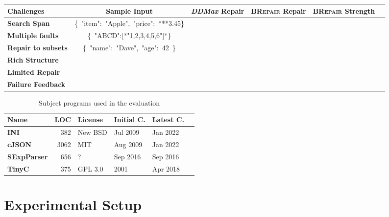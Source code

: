 \documentclass[sigconf,review,anonymous]{acmart}
\newcommand{\approach}{\textsc{BRepair}\xspace}
\newcommand{\ddmax}{\textit{DDMax}\xspace}
\begin{document}
\begin{table*}[!tbp]\centering
\caption{Debugging Richly Structured Inputs: \approach versus \ddmax}
\begin{tabular}{|l | c | r | r | r | r |}
\hline
\textbf{Challenges} & \textbf{Sample Input}  &  \textbf{\ddmax Repair} & \textbf{\approach Repair} & \textbf{\approach Strength}  \\
\hline 
\textbf{Search Span} %
&  \{\ "item":\ "Apple",\ "price":\ ***3.45\} & & & \\ 
\textbf{Multiple faults} & \{\ "ABCD":[*"1,2,3,4,5,6"]*\} & & & \\ 
\textbf{Repair to subsets} & \{\ "name":\ "Dave",\ "age":\ 42\ \} & & & \\ 
\textbf{Rich Structure} & & & & \\ 
\textbf{Limited Repair} & & & & \\ 
\textbf{Failure Feedback} & & & & \\ 
\hline
\end{tabular}
\label{tab:challenges-inp-debug}
\end{table*}


\begin{table}[!tbp]\centering
\caption{Subject programs used in the evaluation}
\begin{tabular}{|l | r | l | l | l | l |}
\hline
\textbf{Name} & \textbf{LOC} & \textbf{License} & \textbf{Initial C.} & \textbf{Latest C.} \\
\hline
\textbf{INI} & 382 & New BSD & Jul 2009 & Jan 2022\\
\textbf{cJSON} & 3062 & MIT & Aug 2009 & Jan 2022\\
\textbf{SExpParser} & 656 & ? & Sep 2016 & Sep 2016\\
\textbf{TinyC} & 375 & GPL 3.0 & 2001 & Apr 2018\\
\hline
\end{tabular}
\label{tab:subject-programs}
\end{table}

\section{Experimental Setup}
\label{sec:experimental-setup}
\end{document}
